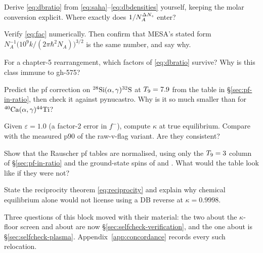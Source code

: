 \begin{selfcheck}
\item Derive \eqref{eq:dbratio} from
      \eqref{eq:saha}--\eqref{eq:dbdensities} yourself, keeping the molar
      conversion explicit. Where exactly does $1/N_A^{\dNs}$ enter?
\item Verify \eqref{eq:fac} numerically. Then confirm that MESA's stated form
      $N_A^{-1}\bigl(10^9 k/(2\pi\hbar^2 N_A)\bigr)^{3/2}$ is the same number,
      and say why.
\item For a chapter-5 rearrangement, which factors of \eqref{eq:dbratio}
      survive? Why is this class immune to gh-575?
\item Predict the pf correction on $\nuc{Si}{28}(\alpha,\gamma)\nuc{S}{32}$ at
      $\Tn = 7.9$ from the table in \S\ref{sec:pf-in-ratio}, then check it
      against pynucastro. Why is it so much smaller than for
      $\nuc{Ca}{40}(\alpha,\gamma)\nuc{Ti}{44}$?
\item Given $\varepsilon = 1.0$ (a factor-2 error in $f^-$), compute $\kappa$ at
      true equilibrium. Compare with the measured p90 of the raw-v-flag variant.
      Are they consistent?
\item Show that the Rauscher pf tables are normalised, using only the $\Tn = 3$
      column of \S\ref{sec:pf-in-ratio} and the ground-state spins of
       and . What would the table look like if they were
      not?
\item State the reciprocity theorem \eqref{eq:reciprocity} and explain why
      chemical equilibrium alone would not license using a DB reverse at
      $\kappa = 0.9998$.
\end{selfcheck}

\begin{aside}
Three questions of this block moved with their material: the two about the
$\kappa$-floor screen and about  are now
\S\ref{sec:selfcheck-verification}, and the one about  is
\S\ref{sec:selfcheck-plasma}. Appendix~\ref{app:concordance} records every such
relocation.
\end{aside}
